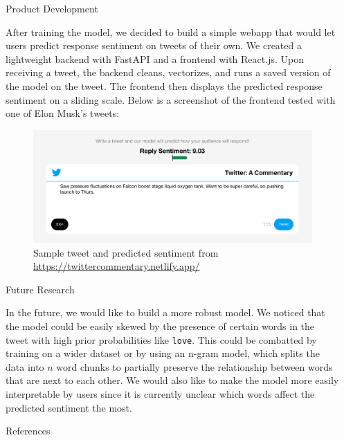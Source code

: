 \documentclass[final]{beamer}
\def\code#1{\texttt{#1}}
\newlength{\sepwidth}
\newlength{\colwidth}
\newcommand{\separatorcolumn}{\begin{column}{\sepwidth}\end{column}}
\begin{document}
\begin{frame}[t]
\begin{columns}[t]
\begin{column}{\colwidth}
  \begin{block}{Product Development}

    After training the model, we decided to build a simple webapp that would let users predict response sentiment on tweets of their own. We created a lightweight backend with FastAPI and a frontend with React.js. Upon receiving a tweet, the backend cleans, vectorizes, and runs a saved version of the model on the tweet. The frontend then displays the predicted response sentiment on a sliding scale. Below is a screenshot of the frontend tested with one of Elon Musk's tweets:

    \begin{figure}[H]
      \centering
      \includegraphics[width=1\textwidth]{product.png}
      \caption{Sample tweet and predicted sentiment from \href{https://twittercommentary.netlify.app/}{https://twittercommentary.netlify.app/}}
    \end{figure}

  \end{block}

  \begin{block}{Future Research}

    In the future, we would like to build a more robust model. We noticed that the model could be easily skewed by the presence of certain words in the tweet with high prior probabilities like \code{love}. This could be combatted by training on a wider dataset or by using an n-gram model, which splits the data into $n$ word chunks to partially preserve the relationship between words that are next to each other. We would also like to make the model more easily interpretable by users since it is currently unclear which words affect the predicted sentiment the most.
  
  \end{block}

  \begin{block}{References}

    \nocite{OpinionInversion}
    \nocite{Survey}
    \footnotesize{}

  \end{block}

\end{column}

\separatorcolumn
\end{columns}
\end{frame}
\end{document}
